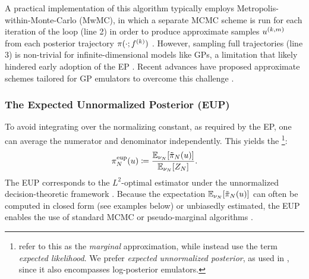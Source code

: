 \documentclass[12pt]{article}
\begin{document}
A practical implementation of this algorithm typically employs Metropolis-within-Monte-Carlo (MwMC), in which 
a separate MCMC scheme is run for each iteration of the loop (line 2) in order to produce approximate samples $u^{(k, m)}$
from each posterior trajectory $\pi(\cdot; f^{(k)})$ \citep{garegnani2021NoisyMCMC, BurknerSurrogate}.
However, sampling full trajectories (line 3) is non-trivial for infinite-dimensional models like GPs, a limitation that 
likely hindered early adoption of the EP \citep{StuartTeck1,SinsbeckNowak,VehtariParallelGP}. Recent advances have proposed 
approximate schemes tailored for GP emulators to overcome this challenge \citep{ourSurrPropPaper,trainDynamics}.

\subsubsection{The Expected Unnormalized Posterior (EUP)}
To avoid integrating over the normalizing constant, as required by the EP, one can average the numerator 
and denominator independently. This yields the 
\footnote{
\citep{StuartTeck1,StuartTeck2,GP_PDE_priors} refer to this as the \textit{marginal} approximation,
while \citep{BurknerSurrogate} instead use the term \textit{expected likelihood}. We prefer 
\textit{expected unnormalized posterior}, as used in \citet{ourSurrPropPaper}, since it also encompasses
log-posterior emulators.
}:
\begin{align}
{\pi}_{N}^{\mathrm{eup}}(u) \coloneqq \frac{\mathbb{E}_{\nu_{N}}[{\tilde{\pi}}_{N}(u)]}{\mathbb{E}_{\nu_{N}}[{Z}_{N}]}.
\label{eq:eup}
\end{align}
The EUP corresponds to the $L^2$-optimal estimator under the unnormalized decision-theoretic framework 
\citep{SinsbeckNowak}. Because the expectation $\mathbb{E}_{\nu_{N}}[{\tilde{\pi}}_{N}(u)]$ can often 
be computed in closed form (see examples below) or unbiasedly estimated, the EUP enables the use 
of standard MCMC or pseudo-marginal \citep{pseudoMarginalMCMC} algorithms \citep{garegnani2021NoisyMCMC}.
\end{document}

